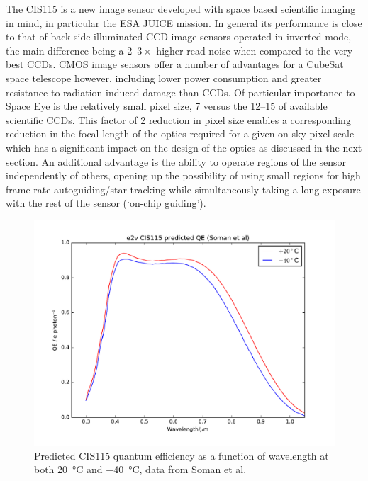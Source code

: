 \documentclass[]{iac}
\begin{document}
The CIS115 is a new image sensor developed with space based scientific imaging in mind, in particular the ESA JUICE
mission. In general its performance is close to that of back side illuminated CCD image sensors operated in inverted
mode, the main difference being a 2--$3\times$ higher read noise when compared to the very best CCDs. CMOS image sensors
offer a number of advantages for a CubeSat space telescope however, including lower power consumption and greater
resistance to radiation induced damage than CCDs. Of particular importance to Space Eye is the relatively small pixel
size, \SI{7}{\micron} versus the 12--\SI{15}{\micron} of available scientific CCDs. This factor of 2 reduction in pixel
size enables a corresponding reduction in the focal length of the optics required for a given on-sky pixel scale which
has a significant impact on the design of the optics as discussed in the next section. An additional advantage is the
ability to operate regions of the sensor independently of others, opening up the possibility of using small regions for
high frame rate autoguiding/star tracking while simultaneously taking a long exposure with the rest of the sensor
(`on-chip guiding').

\begin{figure}[tp]
  \center
  \includegraphics[width=\columnwidth]{figures/CIS115QE.pdf}
  \caption{\label{fig:qe}Predicted CIS115 quantum efficiency as a function of wavelength at both \SI{+20}{\celsius} and
    \SI{-40}{\celsius}, data from Soman et al.\cite{Soman2014}}
\end{figure}
\end{document}

